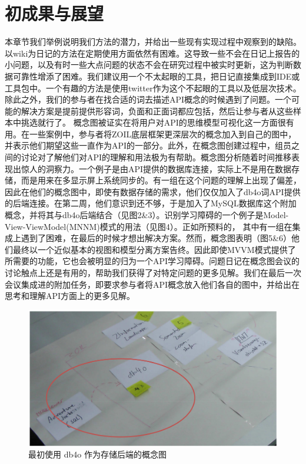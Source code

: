\section*{初成果与展望}
本章节我们举例说明我们方法的潜力，并给出一些现有实现过程中观察到的缺陷。
以wiki为日记的方法在定期使用方面依然有困难。这导致一些不会在日记上报告的小问题，以及有时一些大点问题的状态不会在研究过程中被实时更新，这为判断数据可靠性增添了困难。我们建议用一个不太起眼的工具，把日记直接集成到IDE或工具包中。一个有趣的方法是使用twitter作为这个不起眼的工具以及低层次技术。除此之外，我们的参与者在找合适的词去描述API概念的时候遇到了问题。一个可能的解决方案是提前提供形容词，负面和正面词都应包括，然后让参与者从这些样本中挑选就行了。
概念图被证实在将用户对API的思维模型可视化这一方面很有用。在一些案例中，参与者将ZOIL底层框架更深层次的概念加入到自己的图中，并表示他们期望这些一直作为API的一部分。此外，在概念图创建过程中，组员之间的讨论对了解他们对API的理解和用法极为有帮助。概念图分析随着时间推移表现出惊人的洞察力。一个例子是由API提供的数据库连接，实际上不是用在数据存储，而是用来在多显示屏上系统同步的。有一组在这个问题的理解上出现了偏差，因此在他们的概念图中，即使有数据存储的需求，他们仅仅加入了db4o词API提供的后端连接。在第二周，他们意识到还不够，于是加入了MySQL数据库这个附加概念，并将其与db4o后端结合（见图2\&3）。识别学习障碍的一个例子是Model-View-ViewModel(MNNM)模式的用法（见图4）。正如所预料的， 其中有一组在集成上遇到了困难，在最后的时候才想出解决方案。然而，概念图表明（图5\&6）他们最终以一个近似基本的视图和模型分离方案告终。因此即使MVVM模式提供了所需要的功能，它也会被明显的归为一个API学习障碍。问题日记在概念图会议的讨论触点上还是有用的，帮助我们获得了对特定问题的更多见解。我们在最后一次会议集成进的附加任务，即要求参与者将API概念放入他们各自的图中，并给出在思考和理解API方面上的更多见解。

\begin{figure}
  \begin{center}
    \includegraphics[scale=0.3]{figures/translation/translation_api_fig2.png}\\
    最初使用 db4o 作为存储后端的概念图
  \end{center}
\end{figure}


